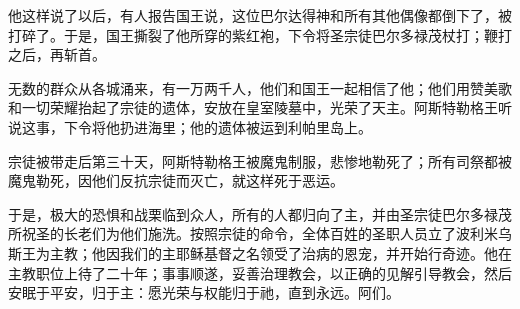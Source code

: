 他这样说了以后，有人报告国王说，这位巴尔达得神和所有其他偶像都倒下了，被打碎了。于是，国王撕裂了他所穿的紫红袍，下令将圣宗徒巴尔多禄茂杖打；鞭打之后，再斩首。\par

无数的群众从各城涌来，有一万两千人，他们和国王一起相信了他；他们用赞美歌和一切荣耀抬起了宗徒的遗体，安放在皇室陵墓中，光荣了天主。阿斯特勒格王听说这事，下令将他扔进海里；他的遗体被运到利帕里岛上。\par

宗徒被带走后第三十天，阿斯特勒格王被魔鬼制服，悲惨地勒死了；所有司祭都被魔鬼勒死，因他们反抗宗徒而灭亡，就这样死于恶运。\par

于是，极大的恐惧和战栗临到众人，所有的人都归向了主，并由圣宗徒巴尔多禄茂所祝圣的长老们为他们施洗。按照宗徒的命令，全体百姓的圣职人员立了波利米乌斯王为主教；他因我们的主耶稣基督之名领受了治病的恩宠，并开始行奇迹。他在主教职位上待了二十年；事事顺遂，妥善治理教会，以正确的见解引导教会，然后安眠于平安，归于主：愿光荣与权能归于祂，直到永远。阿们。\par

